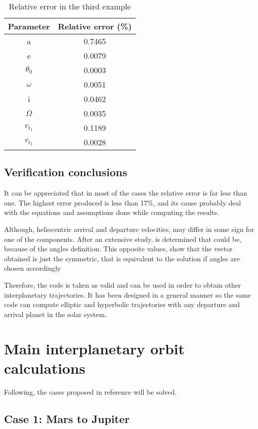 \begin{table}[H]
\centering
\begin{tabular}{|cc|}
\hline
\textbf{Parameter}   & \textbf{Relative error (\%)} \\ \hline
a           & 0.7465              \\
e           & 0.0079              \\
$\theta _0$ & 0.0003              \\
$\omega$    & 0.0051              \\
i           & 0.0462              \\
$\Omega$    & 0.0035              \\
$v_{t_1}$   & 0.1189              \\
$v_{t_1}$   & 0.0028              \\ \hline
\end{tabular}
\caption{Relative error in the third example}
\end{table}
\subsection{Verification conclusions}
It can be appreciated that in most of the cases the relative error is far less than one. The highest error produced is less than 17\%, and its cause probably deal with the equations and assumptions done while computing the results.

Although, heliocentric arrival and departure velocities, may differ in some sign for one of the components. After an extensive study, is determined that could be, because of the angles definition. This opposite values, show that the vector obtained is just the symmetric, that is equivalent to the solution if angles are chosen accordingly

Therefore, the code is taken as valid and can be used in order to obtain other interplanetary trajectories. It has been designed in a general manner so the same code can compute elliptic and hyperbolic trajectories with any departure and arrival planet in the solar system. 

\section{Main interplanetary orbit calculations}
Following, the cases proposed in reference \cite{CalafEnunciat} will be solved. 
\subsection{Case 1: Mars to Jupiter}

